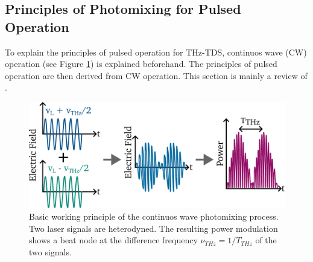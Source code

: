 
\subsection{Principles of Photomixing for Pulsed Operation}
To explain the principles of pulsed operation for THz-TDS, continuos wave (CW) operation (see Figure \ref{fig:cw_basics}) is explained beforehand. The principles of pulsed operation are then derived from CW operation. This section is mainly a review of \cite{nandiErAsInAlGaAsPhotoconductors2021,faridiPulsedFreeSpace2023,preuPrinciplesTHzGeneration2015}.

\begin{figure}
	\includegraphics[width=0.85\linewidth]{figures/cw_principles.pdf}
	\centering
	\caption{Basic working principle of the continuos wave photomixing process. Two laser signals are heterodyned. The resulting power modulation shows a beat node at the difference frequency $\nu_{THz} = 1/T_{THz}$ of the two signals.}
	\label{fig:cw_basics}
\end{figure}

